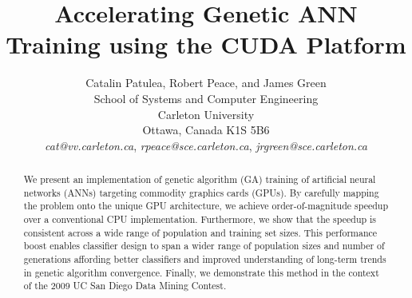 \documentclass[11pt]{article}       %
\begin{document}


\title{Accelerating Genetic ANN Training using the CUDA Platform}


\author{
Catalin Patulea, Robert Peace, and James Green\\
School of Systems and Computer Engineering\\
Carleton University\\
Ottawa, Canada K1S 5B6\\
{\em cat@vv.carleton.ca}, {\em rpeace@sce.carleton.ca}, {\em jrgreen@sce.carleton.ca}
} %

\maketitle

\begin{abstract}
We present an implementation of genetic algorithm (GA) training of artificial neural networks (ANNs) targeting commodity graphics cards (GPUs). By carefully mapping the problem onto the unique GPU architecture, we achieve order-of-magnitude speedup over a conventional CPU implementation. Furthermore, we show that the speedup is consistent across a wide range of population and training set sizes. This performance boost enables classifier design to span a wider range of population sizes and number of generations affording better classifiers and improved understanding of long-term trends in genetic algorithm convergence. Finally, we demonstrate this method in the context of the 2009 UC San Diego Data Mining Contest.
\end{abstract}

\end{document}
